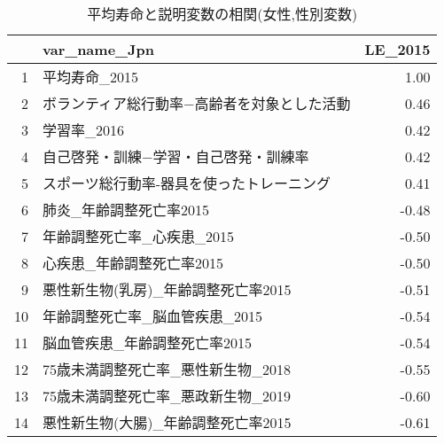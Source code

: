 \begin{table}[H]
\centering
\caption{平均寿命と説明変数の相関(女性,性別変数)}
\label{LE_d_f_corr.tex}
\begingroup\tiny

\begin{adjustbox}{width=.5\textwidth}
\begin{tabular}{rlr}
  \hline
 & var\_name\_Jpn & LE\_2015 \\
  \hline
1 & 平均寿命\_2015 & 1.00 \\
  2 & ボランティア総行動率−高齢者を対象とした活動 & 0.46 \\
  3 & 学習率\_2016 & 0.42 \\
  4 & 自己啓発・訓練−学習・自己啓発・訓練率 & 0.42 \\
  5 & スポーツ総行動率-器具を使ったトレーニング & 0.41 \\
  6 & 肺炎\_年齢調整死亡率2015 & -0.48 \\
  7 & 年齢調整死亡率\_心疾患\_2015 & -0.50 \\
  8 & 心疾患\_年齢調整死亡率2015 & -0.50 \\
  9 & 悪性新生物(乳房)\_年齢調整死亡率2015 & -0.51 \\
  10 & 年齢調整死亡率\_脳血管疾患\_2015 & -0.54 \\
  11 & 脳血管疾患\_年齢調整死亡率2015 & -0.54 \\
  12 & 75歳未満調整死亡率\_悪性新生物\_2018 & -0.55 \\
  13 & 75歳未満調整死亡率\_悪政新生物\_2019 & -0.60 \\
  14 & 悪性新生物(大腸)\_年齢調整死亡率2015 & -0.61 \\
   \hline
\end{tabular}
\end{adjustbox}

\endgroup
\end{table}
